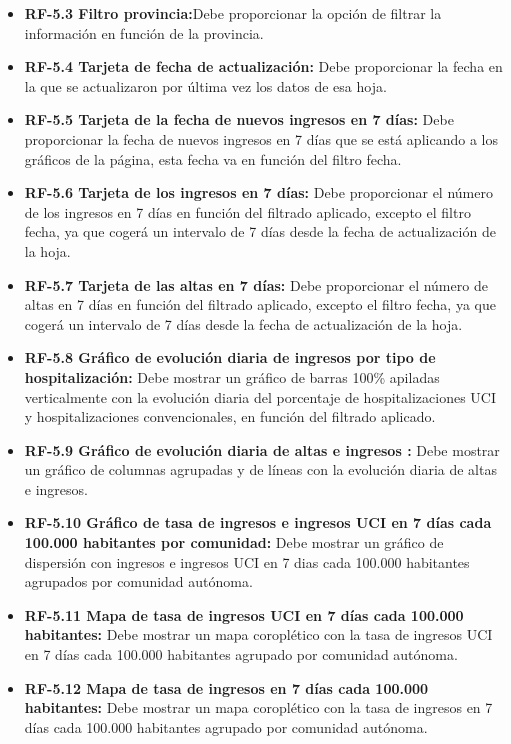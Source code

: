 \begin{itemize}
\begin{itemize}
            \item \textbf{RF-5.3 Filtro provincia:}Debe proporcionar la opción de filtrar la información en función de la provincia.
            \item \textbf{RF-5.4 Tarjeta de fecha de actualización:} Debe proporcionar la fecha en la que se actualizaron por última vez los datos de esa hoja.
            \item \textbf{RF-5.5 Tarjeta de la fecha de nuevos ingresos en 7 días:} Debe proporcionar la fecha de nuevos ingresos en 7 días que se está aplicando a los gráficos de la página, esta fecha va en función del filtro fecha.
            \item \textbf{RF-5.6 Tarjeta de los ingresos en 7 días:} Debe proporcionar el número de los ingresos en 7 días en función del filtrado aplicado, excepto el filtro fecha,  ya que cogerá un intervalo de 7 días desde la fecha de actualización de la hoja.
            \item \textbf{RF-5.7 Tarjeta de las altas en 7 días:} Debe proporcionar el número de altas en 7 días en función del filtrado aplicado, excepto el filtro fecha,  ya que cogerá un intervalo de 7 días desde la fecha de actualización de la hoja.
            \item \textbf{RF-5.8 Gráfico de evolución diaria de ingresos por tipo de hospitalización:} Debe mostrar un gráfico de barras 100\% apiladas verticalmente con la evolución diaria del porcentaje de hospitalizaciones UCI y hospitalizaciones convencionales, en función del filtrado aplicado.
            \item \textbf{RF-5.9 Gráfico de evolución diaria de altas e ingresos :} Debe mostrar un gráfico de columnas agrupadas y de líneas con la evolución diaria de altas e ingresos.
            \item \textbf{RF-5.10 Gráfico de tasa de ingresos e ingresos UCI en 7 días cada 100.000 habitantes por comunidad:} Debe mostrar un gráfico de dispersión con ingresos e ingresos UCI en 7 dias cada 100.000 habitantes agrupados por comunidad autónoma.
            \item \textbf{RF-5.11 Mapa de tasa de ingresos UCI en 7 días cada 100.000 habitantes:} Debe mostrar un mapa coroplético con la tasa de ingresos UCI en 7 días cada 100.000 habitantes agrupado por comunidad autónoma.
            \item \textbf{RF-5.12 Mapa de tasa de ingresos en 7 días cada 100.000 habitantes:} Debe mostrar un mapa coroplético con la tasa de ingresos en 7 días cada 100.000 habitantes agrupado por comunidad autónoma.

\end{itemize}
\end{itemize}
